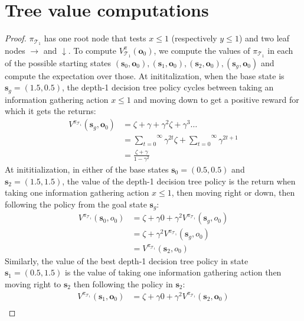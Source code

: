 \section{Tree value computations}\label{calcs}
\begin{proof} $\pi_{\mathcal{T}_1}$ has one root node that tests $x\leq1$ (respectively $y\leq1$) and two leaf nodes $\rightarrow$ and $\downarrow$. 
    To compute $V^\pi_{\mathcal{T}_1}(\boldsymbol{o}_0)$, we compute the values of $\pi_{\mathcal{T}_1}$ in each of the possible starting states $(\boldsymbol{s}_0, \boldsymbol{o}_0), (\boldsymbol{s}_1, \boldsymbol{o}_0), (\boldsymbol{s}_2, \boldsymbol{o}_0), (\boldsymbol{s}_g, \boldsymbol{o}_0)$ and compute the expectation over those. 
    At inititalization, when the base state is $\boldsymbol{s}_g = (1.5, 0.5)$, the depth-1 decision tree policy cycles between taking an information gathering action $x\leq1$ and moving down to get a positive reward for which it gets the returns:
    \begin{align*}
        V^{\pi_{\mathcal{T}_1}} (\boldsymbol{s}_g, \boldsymbol{o}_0) &= \zeta + \gamma + \gamma^2 \zeta + \gamma^3 \dots \\
        &= \overset{\infty}{\underset{t=0}\sum} \gamma^{2t} \zeta + \overset{\infty}{\underset{t=0}\sum} \gamma^{2t+1} \\
        &= \frac{\zeta + \gamma}{1 - \gamma^2}
    \end{align*}
    At inititialization, in either of the base states $\boldsymbol{s}_0=(0.5,0.5)$ and $\boldsymbol{s}_2=(1.5, 1.5)$, the value of the depth-1 decision tree policy is the return when taking one information gathering action $x\leq1$, then moving right or down, then following the policy from the goal state $\boldsymbol{s}_g$:
    \begin{align*}
        V^{\pi_{\mathcal{T}_1}} (\boldsymbol{s}_0, o_0) &= \zeta + \gamma 0 + \gamma^2 V^{\pi_{\mathcal{T}_1}} (\boldsymbol{s}_g, o_0) \\
        &= \zeta + \gamma^2 V^{\pi_{\mathcal{T}_1}} (\boldsymbol{s}_g, o_0) \\
        &= V^{\pi_{\mathcal{T}_1}} (\boldsymbol{s}_2, o_0)
    \end{align*}
    Similarly, the value of the best depth-1 decision tree policy in state $\boldsymbol{s}_1=(0.5,1.5)$ is the value of taking one information gathering action then moving right to $\boldsymbol{s}_2$ then following the policy in $\boldsymbol{s}_2$:
    \begin{align*}
        V^{\pi_{\mathcal{T}_1}} (\boldsymbol{s}_1, \boldsymbol{o}_0) &= \zeta + \gamma 0 + \gamma^2 V^{\pi_{\mathcal{T}_1}} (\boldsymbol{s}_2, \boldsymbol{o}_0) \\

\end{align*}
\end{proof}

